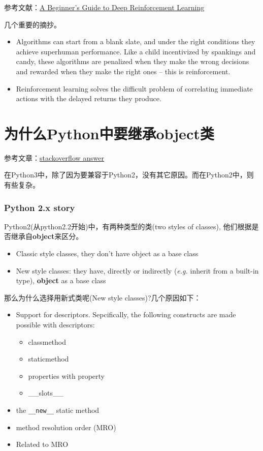参考文献：\href{https://deeplearning4j.org/deepreinforcementlearning}{A Beginner's Guide to Deep Reinforcement Learning}

几个重要的摘抄。
\begin{itemize}
\item Algorithms can start from a blank slate, and under the right conditions they achieve superhuman performance. Like a child incentivized by spankings and candy, these algorithms are penalized when they make the wrong decisions and rewarded when they make the right ones – this is reinforcement.

\item Reinforcement learning solves the difficult problem of correlating immediate actions with the delayed returns they produce. 
\end{itemize}

\section{为什么Python中要继承object类}

参考文章：\href{https://stackoverflow.com/questions/4015417/python-class-inherits-object}{stackoverflow answer}

在Python3中，除了因为要兼容于Python2，没有其它原因。而在Python2中，则有些复杂。

\subsubsection{Python 2.x story}
Python2(从python2.2开始)中，有两种类型的类(two styles of classes), 他们根据是否继承自\textbf{object}来区分。

\begin{itemize}
\item Classic style classes, they don't have object as a base class
\item New style classes: they have, directly or indirectly (\textit{e.g.} inherit from a built-in type), \textbf{object} as a base class
\end{itemize}

那么为什么选择用新式类呢(New style classes)?几个原因如下：
\begin{itemize}
\item Support for descriptors. Sepcifically, the following constructs are made possible with descriptors:
\begin{itemize}
\item classmethod
\item staticmethod
\item properties with property
\item \_\_slots\_\_
\end{itemize}
\item the \verb|__new__| static method
\item method resolution order (MRO)
\item Related to MRO
\end{itemize}

